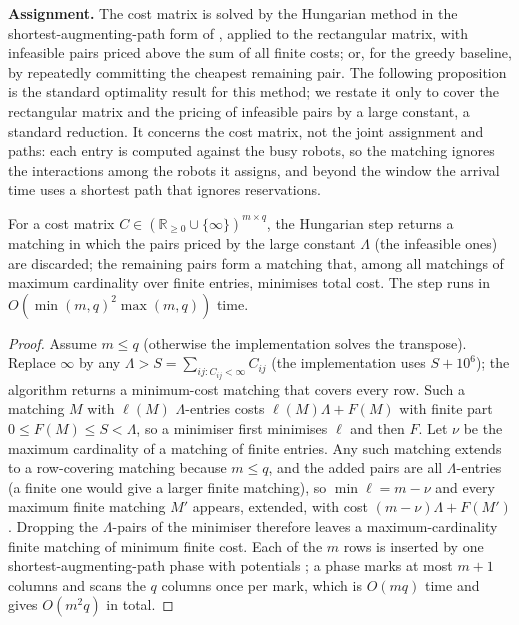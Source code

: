 \noindent\textbf{Assignment.}
The cost matrix is solved by the Hungarian method
\citep{kuhn1955hungarian,munkres1957algorithms} in the
shortest-augmenting-path form of \citet{jonker1987shortest}, applied to the
rectangular matrix, with infeasible
pairs priced above the sum of all finite costs; or, for the greedy baseline,
by repeatedly committing the cheapest remaining pair. The following
proposition is the standard optimality result for this method; we restate it
only to cover the rectangular matrix and the pricing of infeasible pairs by
a large constant, a standard reduction. It concerns the cost matrix, not the joint assignment and paths:
each entry is computed against the busy robots, so the matching ignores the
interactions among the robots it assigns, and beyond the window the
arrival time uses a shortest path that ignores reservations.

\begin{proposition}\label{prop:hungarian}
For a cost matrix $C\in(\mathbb{R}_{\ge0}\cup\{\infty\})^{m\times q}$, the
Hungarian step returns a matching in which the pairs priced by the
large constant $\Lambda$ (the infeasible ones) are discarded; the remaining
pairs form a matching that, among all matchings of maximum
cardinality over finite entries, minimises total cost. The step runs in
$O(\min(m,q)^2\max(m,q))$ time.
\end{proposition}
\begin{proof}
Assume $m\le q$ (otherwise the implementation solves the transpose). Replace
$\infty$ by any $\Lambda>S=\sum_{ij:C_{ij}<\infty}C_{ij}$ (the implementation
uses $S+10^6$); the algorithm returns a minimum-cost matching that covers
every row. Such a matching $M$ with $\ell(M)$ $\Lambda$-entries costs
$\ell(M)\Lambda+F(M)$ with finite part $0\le F(M)\le S<\Lambda$, so a
minimiser first minimises $\ell$ and then $F$. Let $\nu$ be the maximum
cardinality of a matching of finite entries. Any such matching extends to a
row-covering matching because $m\le q$, and the added pairs are all
$\Lambda$-entries (a finite one would give a larger finite matching), so
$\min\ell=m-\nu$ and every maximum finite matching $M'$ appears, extended,
with cost $(m-\nu)\Lambda+F(M')$. Dropping the $\Lambda$-pairs of the
minimiser therefore leaves a maximum-cardinality finite matching of minimum
finite cost. Each of the $m$ rows is inserted by one shortest-augmenting-path
phase with potentials \citep{jonker1987shortest}; a phase marks at most
$m+1$ columns and scans the $q$ columns once per mark, which is $O(mq)$
time and gives $O(m^2q)$ in total.
\end{proof}

